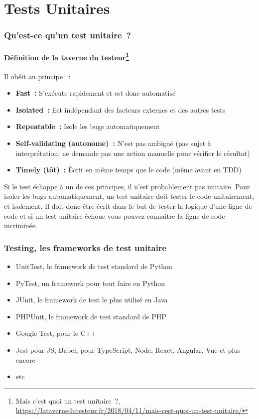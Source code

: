 \documentclass{beamer}
\begin{document}
    \section{Tests Unitaires}\label{sec:tests-unitaires}
    \begin{frame}
        \frametitle{Qu’est-ce qu’un test unitaire~?}
        \framesubtitle{Définition de la taverne du testeur\footnote{Mais c’est quoi un test unitaire~?, \url{https://latavernedutesteur.fr/2018/04/11/mais-cest-quoi-un-test-unitaire/}}}
        \transdissolve
        Il obéit au principe ~:
        \begin{itemize}
            \item \textbf{Fast~:} S’exécute rapidement et est donc automatisé
            \item \textbf{Isolated~:} Est indépendant des facteurs externes et des autres tests
            \item \textbf{Repeatable~:} Isole les bugs automatiquement
            \item \textbf{Self-validating (autonome)~:} N’est pas ambiguë (pas sujet à interprétation, ne demande pas une action manuelle pour vérifier le résultat)
            \item \textbf{Timely (tôt)~:} Écrit en même temps que le code (même avant en TDD)
        \end{itemize}
        Si le test échappe à un de ces principes, il n'est probablement pas unitaire.
        \bigbreak
        Pour isoler les bugs automatiquement, un test unitaire doit tester le code unitairement, et isolement.
        Il doit donc être écrit dans le but de tester la logique d’une ligne de code et si un test unitaire échoue vous pouvez connaitre la ligne de code incriminée.
    \end{frame}

    \begin{frame}
        \transdissolve
        \frametitle{Testing, les frameworks de test unitaire}
        \begin{itemize}
            \item UnitTest, le framework de test standard de Python
            \item PyTest, un framework pour tout faire en Python
            \item JUnit, le framework de test le plus utilisé en Java
            \item PHPUnit, le framework de test standard de PHP
            \item Google Test, pour le C++
            \item Jest pour JS, Babel, pour TypeScript, Node, React, Angular, Vue et plus encore
            \item etc
        \end{itemize}
    \end{frame}
\end{document}
